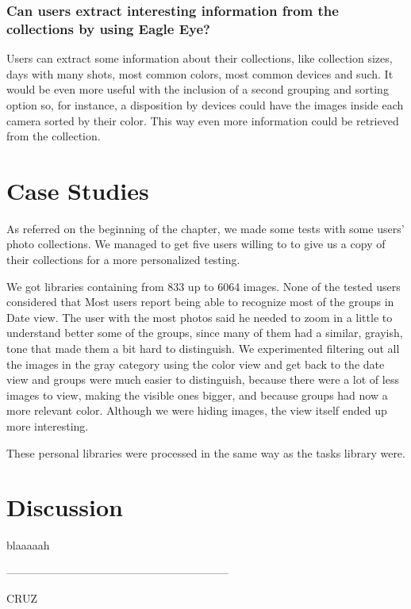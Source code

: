 \subsubsection{Can users extract interesting information from the collections by using Eagle Eye?}

Users can extract some information about their collections, like collection sizes, days with many shots, most common colors, most common devices and such. It would be even more useful with the inclusion of a second grouping and sorting option so, for instance, a disposition by devices could have the images inside each camera sorted by their color. This way even more information could be retrieved from the collection.


\section{Case Studies}

As referred on the beginning of the chapter, we made some tests with some users' photo collections. We managed to get five users willing to to give us a copy of their collections for a more personalized testing.

We got libraries containing from 833 up to 6064 images. None of the tested users considered that  Most users report being able to recognize most of the  groups in Date view. The user with the most photos said he needed to zoom in a little to understand better some of the groups, since many of them had a similar, grayish, tone that made them a bit hard to distinguish. We experimented filtering out all the images in the gray category using the color view and get back to the date view and groups were much easier to distinguish, because there were a lot of less images to view, making the visible ones bigger, and because groups had now a more relevant color. Although we were hiding images, the view itself ended up more interesting.

These personal libraries were processed in the same way as the tasks library were.

\section{Discussion}

blaaaaah

\newpage

————————————————————

CRUZ

